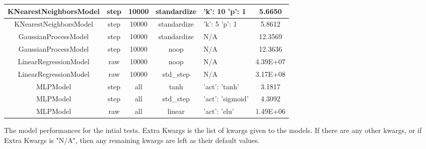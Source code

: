 \documentclass{article}
\newenvironment{changemargin}[2]{%
\begin{list}{}{%
\setlength{\topsep}{0pt}%
\setlength{\leftmargin}{#1}%
\setlength{\rightmargin}{#2}%
\setlength{\listparindent}{\parindent}%
\setlength{\itemindent}{\parindent}%
\setlength{\parsep}{\parskip}%
}%
\item[]}{\end{list}}
\begin{document}
\begin{changemargin}{-3cm}{-1cm}
\begin{minipage}{\linewidth}
\begin{tabular}{|c|c|c|c|p{4cm}|c| }
KNearestNeighborsModel & step & 10000 & standardize & 'k': 10 \newline 'p': 1 & 5.6650 \\\hline
KNearestNeighborsModel & step & 10000 & standardize & 'k': 5 \newline 'p': 1 & 5.8612 \\\hline
GaussianProcessModel & step & 10000 & standardize & N/A & 12.3569 \\\hline
GaussianProcessModel & step & 10000 & noop & N/A & 12.3636 \\\hline
LinearRegressionModel & raw & 10000 & noop & N/A & 4.39E+07 \\\hline
LinearRegressionModel & raw & 10000 & std\_step & N/A & 3.17E+08 \\\hline
MLPModel & step & all & tanh & 'act': 'tanh' & 3.1817 \\\hline
MLPModel & step & all & std\_step & 'act': 'sigmoid' & 4.3092 \\\hline
MLPModel & raw & all & linear & 'act': 'elu' & 1.49E+06 \\\hline
\bottomrule[1.25pt]
\end {tabular}\par
\bigskip
The model performances for the intial tests. Extra Kwargs is the list of kwargs given to the models. If there are any other kwargs, or if Extra Kwargs is "N/A", then any remaining kwargs are left as their default values.
\end{minipage}
\end{changemargin}
\end{document}
